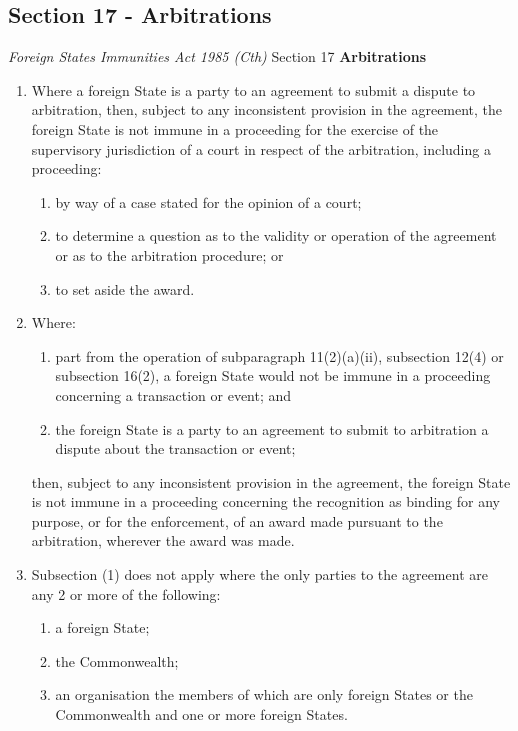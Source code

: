 \subsection{Section 17 - Arbitrations}
\begin{statutedetails}{\textit{Foreign States Immunities Act 1985 (Cth)} Section 17}
    \flushleft
    \textbf{Arbitrations}
    \begin{enumerate}
        \item Where a foreign State is a party to an agreement to submit a dispute to arbitration, then, subject to any inconsistent provision in the agreement, the foreign State is not immune in a proceeding for the exercise of the supervisory jurisdiction of a court in respect of the arbitration, including a proceeding:
        \begin{enumerate}
            \item by way of a case stated for the opinion of a court;
            \item to determine a question as to the validity or operation of the agreement or as to the arbitration procedure; or
            \item to set aside the award.
        \end{enumerate}
        \item Where:
        \begin{enumerate}[label=(\alph*)]
            \item part from the operation of subparagraph 11(2)(a)(ii), subsection 12(4) or subsection 16(2), a foreign State would not be immune in a proceeding concerning a transaction or event; and
            \item the foreign State is a party to an agreement to submit to arbitration a dispute about the transaction or event;
        \end{enumerate}
        then, subject to any inconsistent provision in the agreement, the foreign State is not immune in a proceeding concerning the recognition as binding for any purpose, or for the enforcement, of an award made pursuant to the arbitration, wherever the award was made.
        \item Subsection (1) does not apply where the only parties to the agreement are any 2 or more of the following:
        \begin{enumerate}[label=(\alph*)]
            \item a foreign State;
            \item the Commonwealth;
            \item an organisation the members of which are only foreign States or the Commonwealth and one or more foreign States.
        \end{enumerate}
    \end{enumerate}
\end{statutedetails}

